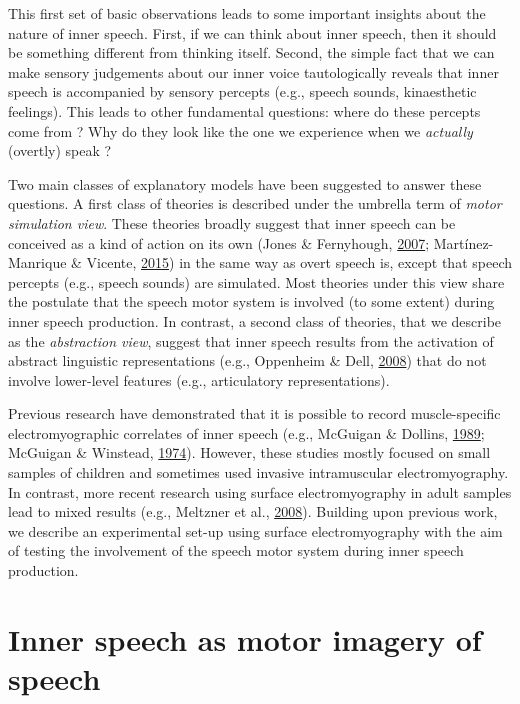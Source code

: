 \documentclass[a4paper,12pt,twoside,openright,oldfontcommands]{memoir}
\begin{document}
This first set of basic observations leads to some important insights about the nature of inner speech. First, if we can think about inner speech, then it should be something different from thinking itself. Second, the simple fact that we can make sensory judgements about our inner voice tautologically reveals that inner speech is accompanied by sensory percepts (e.g., speech sounds, kinaesthetic feelings). This leads to other fundamental questions: where do these percepts come from ? Why do they look like the one we experience when we \emph{actually} (overtly) speak ?

Two main classes of explanatory models have been suggested to answer these questions. A first class of theories is described under the umbrella term of \emph{motor simulation view}. These theories broadly suggest that inner speech can be conceived as a kind of action on its own (Jones \& Fernyhough, \protect\hyperlink{ref-Jones2007}{2007}; Martínez-Manrique \& Vicente, \protect\hyperlink{ref-Martinez-Manrique2015}{2015}) in the same way as overt speech is, except that speech percepts (e.g., speech sounds) are simulated. Most theories under this view share the postulate that the speech motor system is involved (to some extent) during inner speech production. In contrast, a second class of theories, that we describe as the \emph{abstraction view}, suggest that inner speech results from the activation of abstract linguistic representations (e.g., Oppenheim \& Dell, \protect\hyperlink{ref-oppenheim_inner_2008}{2008}) that do not involve lower-level features (e.g., articulatory representations).

Previous research have demonstrated that it is possible to record muscle-specific electromyographic correlates of inner speech (e.g., McGuigan \& Dollins, \protect\hyperlink{ref-mcguigan_patterns_1989}{1989}; McGuigan \& Winstead, \protect\hyperlink{ref-mcguigan_discriminative_1974}{1974}). However, these studies mostly focused on small samples of children and sometimes used invasive intramuscular electromyography. In contrast, more recent research using surface electromyography in adult samples lead to mixed results (e.g., Meltzner et al., \protect\hyperlink{ref-meltzner_speech_2008}{2008}). Building upon previous work, we describe an experimental set-up using surface electromyography with the aim of testing the involvement of the speech motor system during inner speech production.

\hypertarget{inner-speech-as-motor-imagery-of-speech}{%
\section{Inner speech as motor imagery of speech}\label{inner-speech-as-motor-imagery-of-speech}}
\end{document}
